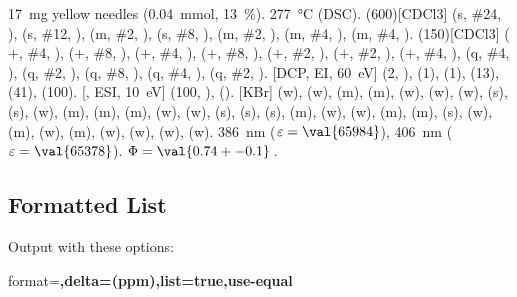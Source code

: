 \documentclass{chemmacros-manual}
\begin{document}
\begin{experimental}[delta=(ppm),pos-number=sub,use-equal]
   \SI{17}{\milli\gram} yellow needles (\SI{0.04}{\milli\mole},
  \SI{13}{\percent}).
   \SI{277}{\celsius} (DSC).
  \NMR(600)[CDCl3]  (s, \#{24}, ),  (s, \#{12},
  ),  (m, \#{2}, ),  (s, \#{8},
  ),  (m, \#{2}, ),  (m, \#{4},
  ),  (m, \#{4}, ).
  (150)[CDCl3]  ($+$, \#{4}, ),  ($+$,
  \#{8}, ),  ($+$, \#{4}, ),  ($+$, \#{8},
  ),  ($+$, \#{2}, ),  ($+$, \#{2},
  ),  ($+$, \#{4}, ),  (q, \#{4},
  ),  (q, \#{2}, ),  (q, \#{8}, ),
   (q, \#{4}, ),  (q, \#{2}, ).
  [DCP, EI, \SI{60}{\electronvolt}]  (2, ), 
  (1),  (1),  (13),  (41),  (100).
  [, ESI, \SI{10}{\electronvolt}]  (100,
  ),  ().
  [KBr]  (w),  (w),  (m), 
  (m),  (w),  (w),  (w),  (s),
   (s),  (w),  (m),  (m), 
  (m),  (w),  (w),  (s),  (s),
   (s),  (m),  (w),  (w), 
  (m),  (m),  (s),  (w),  (m), 
  (w),  (m),  (w),  (w),  (w), 
  (w).
   \SI{386}{\nano\metre} ($\varepsilon = \val{65984}$),
  \SI{406}{\nano\metre} ($\varepsilon = \val{65378}$).
   $\Phi = \val{0.74+-0.1}$\,.
\end{experimental}

\subsection{Formatted List}
Output with these options:

\begin{sourcecode}
  format=\bfseries,delta=(ppm),list=true,use-equal
\end{sourcecode}
\end{document}
